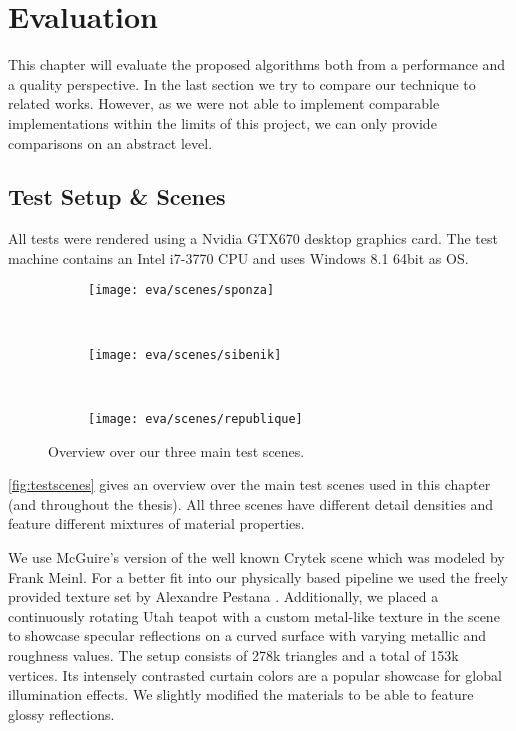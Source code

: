 \documentclass[thesis.tex]{subfiles}
\begin{document}
\chapter{Evaluation}\label{chap:eva}
This chapter will evaluate the proposed algorithms both from a performance and a quality perspective.
In the last section we try to compare our technique to related works.
However, as we were not able to implement comparable implementations within the limits of this project, we can only provide comparisons on an abstract level.

\section{Test Setup \& Scenes} \label{sec:eva:setup}
All tests were rendered using a Nvidia GTX670 desktop graphics card.
The test machine contains an Intel i7-3770 CPU and uses Windows 8.1 64bit as OS.

\begin{figure}
\centering
\begin{subfigure}[b]{0.8\textwidth}
\centering
\texttt{[image: eva/scenes/sponza]}
\caption{}
\end{subfigure}
\\
\begin{subfigure}[b]{0.8\textwidth}
\centering
\texttt{[image: eva/scenes/sibenik]}
\caption{}
\end{subfigure}
\\
\begin{subfigure}[b]{0.8\textwidth}
\centering
\texttt{[image: eva/scenes/republique]}
\caption{}
\end{subfigure}
\caption{Overview over our three main test scenes.}
\label{fig:testscenes}
\end{figure}
\autoref{fig:testscenes} gives an overview over the main test scenes used in this chapter (and throughout the thesis).
All three scenes have different detail densities and feature different mixtures of material properties.

We use McGuire's \cite{bib:McGuire2011Data} version of the well known Crytek  scene which was modeled by Frank Meinl.
For a better fit into our physically based pipeline we used the freely provided texture set  by Alexandre Pestana \cite{bib:sponzapbr}.
Additionally, we placed a continuously rotating Utah teapot with a custom metal-like texture in the scene to showcase specular reflections on a curved surface with varying metallic and roughness values.
The setup consists of 278k triangles and a total of 153k vertices.
Its intensely contrasted curtain colors are a popular showcase for global illumination effects.
We slightly modified the materials to be able to feature glossy reflections.
\end{document}
